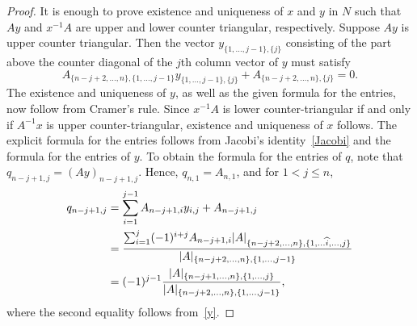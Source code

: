 \documentclass[11pt]{amsart}
\theoremstyle{definition}
\numberwithin{equation}{section}
\DeclarePairedDelimiter{\Norm}{\lvert}{\rvert}
\def\g{\gamma}
\def\d{\delta}
\begin{document}
\begin{proof}
It is enough to prove existence and uniqueness of $x$ and $y$ in $N$ such 
that $Ay$ and $x^{-1}A$ are upper and lower counter triangular, respectively. 
Suppose $Ay$ is upper counter triangular. Then the vector $y_{\{1,\dots,j-1\},\{j\}}$ 
consisting of the part above the counter diagonal of the $j$th column vector 
of $y$ must satisfy 
\begin{equation}A_{\{n-j+2,\dots,n\},\{1,\dots,j-1\}}y_{\{1,\dots, j-1\},\{j\}}
+A_{\{n-j+2,\dots,n\},\{j\}}=0.
\end{equation}
The existence and uniqueness of $y$, as well as the given formula for the entries, now follow from Cramer's rule.
Since $x^{-1}A$ is lower counter-triangular if and only if $A^{-1}x$ is upper counter-triangular, existence and uniqueness of $x$ follows. The explicit formula for the entries follows from Jacobi's identity~\eqref{Jacobi} and the formula for the entries of $y$. To obtain the formula for the entries of $q$, note that $q_{n-j+1,j}=(Ay)_{n-j+1,j}$. Hence, $q_{n,1}=A_{n,1}$, and for $1<j\leq n$,
\begin{align*}
q_{n-j+1,j}&=\sum_{i=1}^{j-1}A_{n-j+1,i}y_{i,j}+A_{n-j+1,j}\\&=\frac{\sum_{i=1}^{j}(-1)^{i+j}A_{n-j+1,i}\Norm{A}_{\{n-j+2,\dots,n\},\{1,\dots\widehat i,\dots,j\}}}{\Norm{A}_{\{n-j+2,\dots,n\},\{1,\dots,j-1\}}}\\&=(-1)^{j-1}\frac{\Norm{A}_{\{n-j+1,\dots,n\},\{1,\dots,j\}}}{\Norm{A}_{\{n-j+2,\dots,n\},\{1,\dots,j-1\}}},
\end{align*}
where the second equality follows from~\eqref{y}.
\end{proof}
\end{document}
